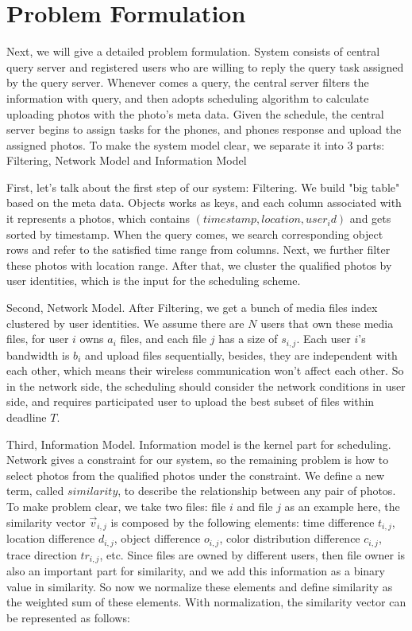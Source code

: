 
\section{Problem Formulation}
\label{sec:probl}

Next, we will give a detailed problem formulation. System consists of central query server and registered users who are willing to reply the query task assigned by the query server. Whenever comes a query, the central server filters the information with query, and then adopts scheduling algorithm to calculate uploading photos with the photo's meta data. Given the schedule, the central server begins to assign tasks for the phones, and phones response and upload the assigned photos. To make the system model clear, we separate it into 3 parts: Filtering, Network Model and Information Model

First, let's talk about the first step of our system: Filtering. We build "big table" based on the meta data. Objects works as keys, and each column associated with it represents a photos, which contains $(timestamp, location, user_id)$ and gets sorted by timestamp. When the query comes, we search corresponding object rows and refer to the satisfied time range from columns. Next, we further filter these photos with location range. After that, we cluster the qualified photos by user identities, which is the input for the scheduling scheme.

Second, Network Model. After Filtering, we get a bunch of  media files index clustered by user identities. We assume there are $N$ users that own these media files, for user $i$ owns $a_{i}$ files, and each file $j$ has a size of $s_{i,j}$. Each user $i$'s bandwidth is $b_{i}$ and upload files sequentially, besides, they are independent with each other, which means their wireless communication won't affect each other. So in the network side, the scheduling should consider the network conditions in user side, and requires participated user to upload the best subset of files within deadline $T$.

Third, Information Model. Information model is the kernel part for scheduling. Network  gives a constraint for our system,
 so the remaining problem is how to select photos from the qualified photos under the constraint. We define a new term, called ${similarity}$, to describe the relationship between any pair of photos. To make problem clear, we take two files: file $i$ and file $j$ as an example here, the similarity vector ${\overrightarrow{v}_{i,j}}$ is composed by the following elements: time difference ${t_{i,j}}$, location difference ${d_{i,j}}$, object difference ${o_{i,j}}$, color distribution difference ${c_{i,j}}$, trace direction ${tr_{i,j}}$, etc. Since files are owned by different users, then file owner is also an important part for similarity, and we add this information as a binary value in similarity. So now we normalize these elements and define similarity as the weighted sum of these elements. With normalization, the similarity vector can be represented as follows:


